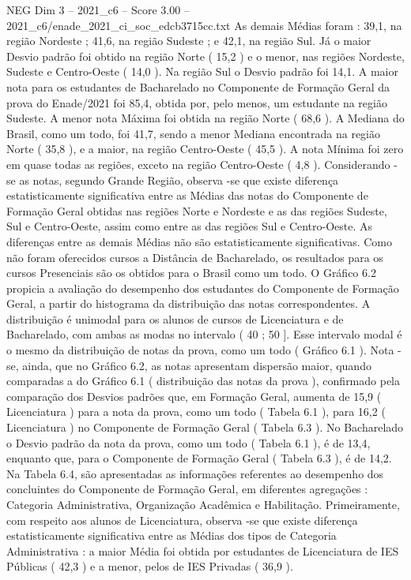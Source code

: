 \begin{textsample}{NEG Dim 3 – 2021\_c6 – Score 3.00 – 2021\_c6/enade\_2021\_ci\_soc\_edcb3715cc.txt}
As demais Médias foram : 39,1, na região Nordeste ; 41,6, na região Sudeste ; e 42,1, na região Sul.
Já o maior Desvio padrão foi obtido na região Norte ( 15,2 ) e o menor, nas regiões Nordeste, Sudeste e Centro-Oeste ( 14,0 ).
Na região Sul o Desvio padrão foi 14,1.
A maior nota para os estudantes de Bacharelado no Componente de Formação Geral da prova do Enade/2021 foi 85,4, obtida por, pelo menos, um estudante na região Sudeste.
A menor nota Máxima foi obtida na região Norte ( 68,6 ).
A Mediana do Brasil, como um todo, foi 41,7, sendo a menor Mediana encontrada na região Norte ( 35,8 ), e a maior, na região Centro-Oeste ( 45,5 ).
A nota Mínima foi zero em quase todas as regiões, exceto na região Centro-Oeste ( 4,8 ).
Considerando -se as notas, segundo Grande Região, observa -se que existe diferença estatisticamente significativa entre as Médias das notas do Componente de Formação Geral obtidas nas regiões Norte e Nordeste e as das regiões Sudeste, Sul e Centro-Oeste, assim como entre as das regiões Sul e Centro-Oeste.
As diferenças entre as demais Médias não são estatisticamente significativas.
Como não foram oferecidos cursos a Distância de Bacharelado, os resultados para os cursos Presenciais são os obtidos para o Brasil como um todo.
O Gráfico 6.2 propicia a avaliação do desempenho dos estudantes do Componente de Formação Geral, a partir do histograma da distribuição das notas correspondentes.
A distribuição é unimodal para os alunos de cursos de Licenciatura e de Bacharelado, com ambas as modas no intervalo ( 40 ; 50 ].
Esse intervalo modal é o mesmo da distribuição de notas da prova, como um todo ( Gráfico 6.1 ).
Nota -se, ainda, que no Gráfico 6.2, as notas apresentam dispersão maior, quando comparadas a do Gráfico 6.1 ( distribuição das notas da prova ), confirmado pela comparação dos Desvios padrões que, em Formação Geral, aumenta de 15,9 ( Licenciatura ) para a nota da prova, como um todo ( Tabela 6.1 ), para 16,2 ( Licenciatura ) no Componente de Formação Geral ( Tabela 6.3 ).
No Bacharelado o Desvio padrão da nota da prova, como um todo ( Tabela 6.1 ), é de 13,4, enquanto que, para o Componente de Formação Geral ( Tabela 6.3 ), é de 14,2.
Na Tabela 6.4, são apresentadas as informações referentes ao desempenho dos concluintes do Componente de Formação Geral, em diferentes agregações : Categoria Administrativa, Organização Acadêmica e Habilitação.
Primeiramente, com respeito aos alunos de Licenciatura, observa -se que existe diferença estatisticamente significativa entre as Médias dos tipos de Categoria Administrativa : a maior Média foi obtida por estudantes de Licenciatura de IES Públicas ( 42,3 ) e a menor, pelos de IES Privadas ( 36,9 ).

\end{textsample}
